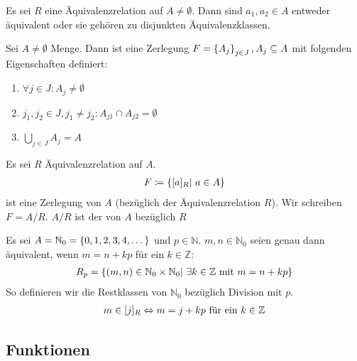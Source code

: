 \begin{korollar}
    Es sei $R$ eine Äquivalenzrelation auf $A\neq \emptyset$. Dann sind $a_1,a_2\in A$ entweder äquivalent oder sie gehören zu disjunkten Äquivalenzklassen.
\end{korollar}

\begin{definition}
    Sei $A\neq \emptyset$ Menge. Dann ist eine Zerlegung $F = \left\{A_j\right\}_{j\in J}, A_j\subseteq A$ mit folgenden Eigenschaften definiert:
    \begin{enumerate}
        \item $\forall j\in J: A_j\neq \emptyset$
        \item $j_1, j_2\in J, j_1\neq j_2: A_{j1} \cap A_{j2} = \emptyset$
        \item $\bigcup_{j\in J}A_j = A$
    \end{enumerate}
\end{definition}

\begin{notation}[Quotient]
    Es sei $R$ Äquivalenzrelation auf $A$.
    \begin{align*}
        F\coloneqq\left\{[a]_R|~a\in A\right\}
    \end{align*}
    ist eine Zerlegung von $A$ (bezüglich der Äquivalenzrelation $R$). Wir schreiben $F = A/R$.
    $A/R$ ist der  von $A$ bezüglich $R$
\end{notation}

\begin{beispiel}
    Es sei $A = \mathbb{N}_{0} = \left\{0,1,2,3,4,\dots\right\}$ und $p\in \mathbb{N}$. $m,n\in\mathbb{N}_0$ seien genau dann äquivalent, wenn $m=n+kp$ für ein $k\in\mathbb{Z}$:
    \begin{align*}
        R_{p} = \left\{\left(m,n\right)\in \mathbb{N}_0 \times \mathbb{N}_0 |~\exists k\in \mathbb{Z}\text{ mit } m=n+kp\right\}
    \end{align*}
    So definieren wir die Restklassen von $\mathbb{N}_0$ bezüglich Division mit $p$.
    \begin{align*}
        m\in [j]_{R} \Leftrightarrow{} m=j+kp\text{ für ein }k\in\mathbb{Z}
    \end{align*}
\end{beispiel}


\subsection{Funktionen}

